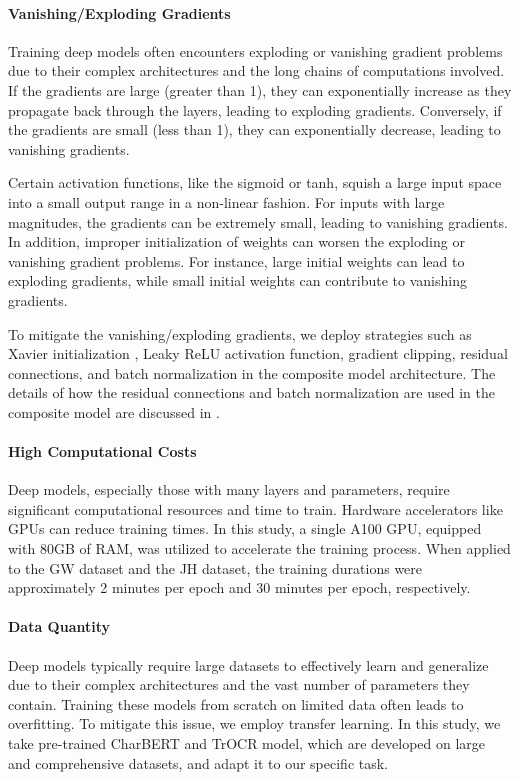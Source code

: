 \paragraph*{Vanishing/Exploding Gradients}
\label{par:4_vanishing_exploding_gradients}
Training deep models often encounters exploding or vanishing gradient problems due to their complex architectures and the long chains of computations involved. If the gradients are large (greater than 1), they can exponentially increase as they propagate back through the layers, leading to exploding gradients. Conversely, if the gradients are small (less than 1), they can exponentially decrease, leading to vanishing gradients.

Certain activation functions, like the sigmoid or tanh, squish a large input space into a small output range in a non-linear fashion. For inputs with large magnitudes, the gradients can be extremely small, leading to vanishing gradients. In addition, improper initialization of weights can worsen the exploding or vanishing gradient problems. For instance, large initial weights can lead to exploding gradients, while small initial weights can contribute to vanishing gradients.

To mitigate the vanishing/exploding gradients, we deploy strategies such as Xavier initialization \citep{glorot2010understanding}, Leaky ReLU activation function, gradient clipping, residual connections, and batch normalization in the composite model architecture. The details of how the residual connections and batch normalization are used in the composite model are discussed in .

\paragraph*{High Computational Costs}
\label{par:4_high_computational_costs}
Deep models, especially those with many layers and parameters, require significant computational resources and time to train. Hardware accelerators like GPUs can reduce training times. In this study, a single A100 GPU, equipped with 80GB of RAM, was utilized to accelerate the training process. When applied to the GW dataset and the JH dataset, the training durations were approximately 2 minutes per epoch and 30 minutes per epoch, respectively.

\paragraph*{Data Quantity}
\label{par:4_data_quantity}
Deep models typically require large datasets to effectively learn and generalize due to their complex architectures and the vast number of parameters they contain. Training these models from scratch on limited data often leads to overfitting. To mitigate this issue, we employ transfer learning. In this study, we take pre-trained CharBERT and TrOCR model, which are developed on large and comprehensive datasets, and adapt it to our specific task. 

